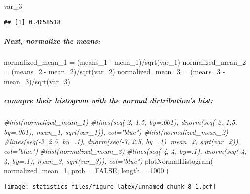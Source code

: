 \documentclass[
]{article}
\newenvironment{Shaded}{\begin{snugshade}}{\end{snugshade}}
\newcommand{\AttributeTok}[1]{\textcolor[rgb]{0.77,0.63,0.00}{#1}}
\newcommand{\CommentTok}[1]{\textcolor[rgb]{0.56,0.35,0.01}{\textit{#1}}}
\newcommand{\ConstantTok}[1]{\textcolor[rgb]{0.00,0.00,0.00}{#1}}
\newcommand{\DecValTok}[1]{\textcolor[rgb]{0.00,0.00,0.81}{#1}}
\newcommand{\FunctionTok}[1]{\textcolor[rgb]{0.00,0.00,0.00}{#1}}
\newcommand{\NormalTok}[1]{#1}
\newcommand{\OtherTok}[1]{\textcolor[rgb]{0.56,0.35,0.01}{#1}}
\newcommand{\SpecialCharTok}[1]{\textcolor[rgb]{0.00,0.00,0.00}{#1}}
\begin{document}
\begin{Shaded}
\begin{Highlighting}[]
\NormalTok{var\_3}
\end{Highlighting}
\end{Shaded}

\begin{verbatim}
## [1] 0.4058518
\end{verbatim}

\hypertarget{next-normalize-the-means}{%
\subparagraph{Next, normalize the
means:}\label{next-normalize-the-means}}

\begin{Shaded}
\begin{Highlighting}[]
\NormalTok{normalized\_mean\_1 }\OtherTok{=}\NormalTok{ (means\_1 }\SpecialCharTok{{-}}\NormalTok{ mean\_1)}\SpecialCharTok{/}\FunctionTok{sqrt}\NormalTok{(var\_1)}
\NormalTok{normalized\_mean\_2 }\OtherTok{=}\NormalTok{ (means\_2 }\SpecialCharTok{{-}}\NormalTok{ mean\_2)}\SpecialCharTok{/}\FunctionTok{sqrt}\NormalTok{(var\_2)}
\NormalTok{normalized\_mean\_3 }\OtherTok{=}\NormalTok{ (means\_3 }\SpecialCharTok{{-}}\NormalTok{ mean\_3)}\SpecialCharTok{/}\FunctionTok{sqrt}\NormalTok{(var\_3)}
\end{Highlighting}
\end{Shaded}

\hypertarget{comapre-their-histogram-with-the-normal-dirtributions-hist}{%
\subparagraph{comapre their histogram with the normal dirtribution's
hist:}\label{comapre-their-histogram-with-the-normal-dirtributions-hist}}

\begin{Shaded}
\begin{Highlighting}[]
\CommentTok{\#hist(normalized\_mean\_1)}
\CommentTok{\#lines(seq({-}2, 1.5, by=.001), dnorm(seq({-}2, 1.5, by=.001), mean\_1, sqrt(var\_1)), col="blue")}
\CommentTok{\#hist(normalized\_mean\_2)}
\CommentTok{\#lines(seq({-}3, 2.5, by=.1), dnorm(seq({-}3, 2.5, by=.1), mean\_2, sqrt(var\_2)), col="blue")}
\CommentTok{\#hist(normalized\_mean\_3)}
\CommentTok{\#lines(seq({-}4, 4, by=.1), dnorm(seq({-}4, 4, by=.1), mean\_3, sqrt(var\_3)), col="blue")}
\FunctionTok{plotNormalHistogram}\NormalTok{( normalized\_mean\_1, }\AttributeTok{prob =} \ConstantTok{FALSE}\NormalTok{, }\AttributeTok{length =} \DecValTok{1000}\NormalTok{ )}
\end{Highlighting}
\end{Shaded}

\texttt{[image: statistics\_files/figure-latex/unnamed-chunk-8-1.pdf]}
\end{document}
